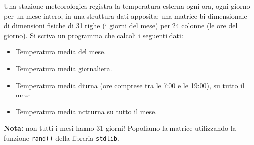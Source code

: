 \begin{Exercise}[label={ex:temperatura}]
    Una stazione meteorologica registra la temperatura esterna ogni ora, ogni giorno per un mese intero, in una struttura dati apposita: una matrice bi-dimensionale di dimensioni fisiche di 31 righe (i giorni del mese) per 24 colonne (le ore del giorno).
    Si scriva un programma che calcoli i seguenti dati:
    \begin{itemize}
        \item Temperatura media del mese.
        \item Temperatura media giornaliera.
        \item Temperatura media diurna (ore comprese tra le 7:00 e le 19:00), su tutto il mese.
        \item Temperatura media notturna su tutto il mese.
    \end{itemize}

    \textbf{Nota: } non tutti i mesi hanno 31 giorni! Popoliamo la matrice utilizzando la funzione \texttt{rand()} della libreria \texttt{stdlib}.
\end{Exercise}

\begin{Answer}[ref={ex:temperatura}]
  	
\end{Answer}
